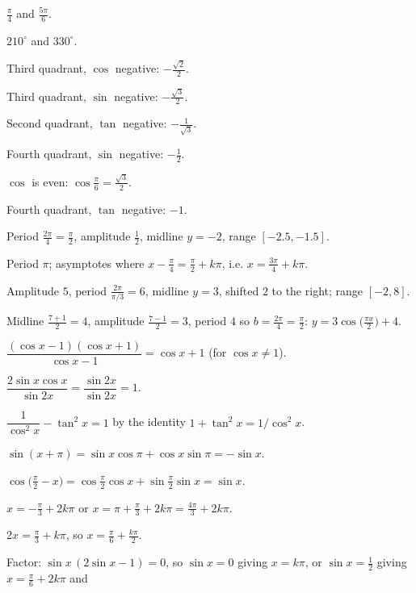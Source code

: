 \begin{solutions}
  \item $\tfrac{\pi}{4}$ and $\tfrac{5\pi}{6}$.
  \item $210^{\circ}$ and $330^{\circ}$.
  \item Third quadrant, $\cos$ negative:
        $-\tfrac{\sqrt2}{2}$.
  \item Third quadrant, $\sin$ negative:
        $-\tfrac{\sqrt3}{2}$.
  \item Second quadrant, $\tan$ negative:
        $-\tfrac{1}{\sqrt3}$.
  \item Fourth quadrant, $\sin$ negative:
        $-\tfrac12$.
  \item $\cos$ is even: $\cos\tfrac{\pi}{6}=\tfrac{\sqrt3}{2}$.
  \item Fourth quadrant, $\tan$ negative: $-1$.
  \item Period $\tfrac{2\pi}{4}=\tfrac{\pi}{2}$, amplitude $\tfrac12$,
        midline $y=-2$, range $[-2.5,-1.5]$.
  \item Period $\pi$; asymptotes where
        $x-\tfrac{\pi}{4}=\tfrac{\pi}{2}+k\pi$, i.e.
        $x=\tfrac{3\pi}{4}+k\pi$.
  \item Amplitude $5$, period $\tfrac{2\pi}{\pi/3}=6$, midline $y=3$,
        shifted $2$ to the right; range $[-2,8]$.
  \item Midline $\tfrac{7+1}{2}=4$, amplitude $\tfrac{7-1}{2}=3$, period
        $4$ so $b=\tfrac{2\pi}{4}=\tfrac{\pi}{2}$:
        $y=3\cos\bigl(\tfrac{\pi x}{2}\bigr)+4$.
  \item $\dfrac{(\cos x-1)(\cos x+1)}{\cos x-1}=\cos x+1$ (for
        $\cos x\neq1$).
  \item $\dfrac{2\sin x\cos x}{\sin 2x}=\dfrac{\sin 2x}{\sin 2x}=1$.
  \item $\dfrac{1}{\cos^{2}x}-\tan^{2}x=1$ by the identity
        $1+\tan^{2}x=1/\cos^{2}x$.
  \item $\sin(x+\pi)=\sin x\cos\pi+\cos x\sin\pi=-\sin x$.
  \item $\cos\bigl(\tfrac{\pi}{2}-x\bigr)
        =\cos\tfrac{\pi}{2}\cos x+\sin\tfrac{\pi}{2}\sin x=\sin x$.
  \item $x=-\tfrac{\pi}{3}+2k\pi$ or
        $x=\pi+\tfrac{\pi}{3}+2k\pi=\tfrac{4\pi}{3}+2k\pi$.
  \item $2x=\tfrac{\pi}{3}+k\pi$, so
        $x=\tfrac{\pi}{6}+\tfrac{k\pi}{2}$.
  \item Factor: $\sin x\,(2\sin x-1)=0$, so $\sin x=0$ giving $x=k\pi$, or
        $\sin x=\tfrac12$ giving $x=\tfrac{\pi}{6}+2k\pi$ and

\end{solutions}
